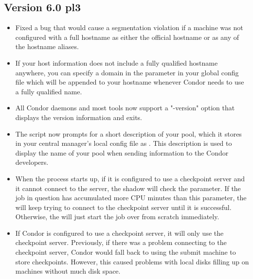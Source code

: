 \subsection{\label{sec:New-6-0-pl3}Version 6.0 pl3}

\begin{itemize}

\item Fixed a bug that would cause a segmentation violation if a
machine was not configured with a full hostname as either the official
hostname or as any of the hostname aliases.

\item If your host information does not include a fully qualified
hostname anywhere, you can specify a domain in the
 parameter in your global config file
which will be appended to your hostname whenever Condor needs to use a
fully qualified name.

\item All Condor daemons and most tools now support a "-version"
option that displays the version information and exits.

\item The  script now prompts for a short description
of your pool, which it stores in your central manager's local config
file as .
This description is used to display the name of your pool when sending
information to the Condor developers.

\item When the  process starts up, if it is configured
to use a checkpoint server and it cannot connect to the server, the
shadow will check the  parameter.  
If the job in question has accumulated more CPU minutes than this
parameter, the  will keep trying to connect to the
checkpoint server until it is successful.
Otherwise, the  will just start the job over from
scratch immediately.

\item If Condor is configured to use a checkpoint server, it will only
use the checkpoint server.
Previously, if there was a problem connecting to the checkpoint
server, Condor would fall back to using the submit machine to store
checkpoints.
However, this caused problems with local disks filling up on machines
without much disk space.


\end{itemize}
